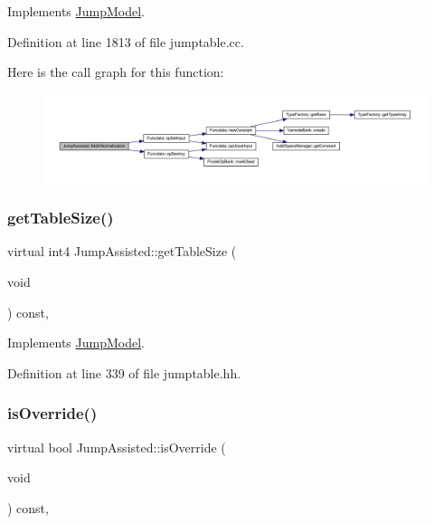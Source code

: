 Implements \mbox{\hyperlink{class_jump_model_a8c346de087366515ed90ba1d27012451}{Jump\+Model}}.



Definition at line 1813 of file jumptable.\+cc.

Here is the call graph for this function\+:
\nopagebreak
\begin{figure}[H]
\begin{center}
\leavevmode
\includegraphics[width=350pt]{class_jump_assisted_aa9732767f921501368f90bd0d1defa1a_cgraph}
\end{center}
\end{figure}
\mbox{\label{class_jump_assisted_a4d6285c9afd737070fe335b86d7592fa}} 
\subsubsection{\texorpdfstring{getTableSize()}{getTableSize()}}
{\footnotesize\ttfamily virtual int4 Jump\+Assisted\+::get\+Table\+Size (\begin{DoxyParamCaption}\item[{void}]{ }\end{DoxyParamCaption}) const\hspace{0.3cm}{\ttfamily [inline]}, {\ttfamily [virtual]}}



Implements \mbox{\hyperlink{class_jump_model_acbc757d5fe05e9e8cb15697ddc73f367}{Jump\+Model}}.



Definition at line 339 of file jumptable.\+hh.

\mbox{\label{class_jump_assisted_a1169f3856b15ba64fb229deec899a49b}} 
\subsubsection{\texorpdfstring{isOverride()}{isOverride()}}
{\footnotesize\ttfamily virtual bool Jump\+Assisted\+::is\+Override (\begin{DoxyParamCaption}\item[{void}]{ }\end{DoxyParamCaption}) const\hspace{0.3cm}{\ttfamily [inline]}, {\ttfamily [virtual]}}



